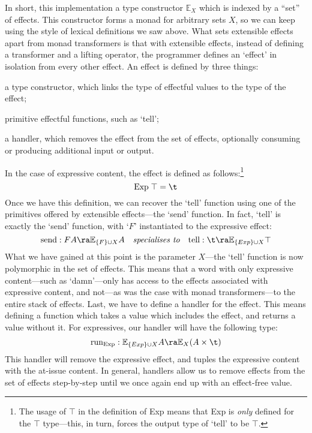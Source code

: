 In short, this implementation a type constructor $\mathbb{E}_X$ which
is indexed by a ``set'' of effects. This constructor forms a monad for
arbitrary sets $X$, so we can keep using the style of lexical
definitions we saw above.
What sets extensible effects apart from monad transformers is that
with extensible effects, instead of defining a transformer and a
lifting operator, the programmer defines an `effect' in isolation from
every other effect. An effect is defined by three things:
\begin{enumerate*}[label=\arabic*)]
\item a type constructor, which links the type of effectful values to
  the type of the effect;
\item primitive effectful functions, such as `tell';
\item a handler, which removes the effect from the set of effects,
  optionally consuming or producing additional input or output.
\end{enumerate*}
In the case of expressive content, the effect is
defined as follows:\footnote{%
  The usage of $\top$ in the definition of Exp means that Exp is
  \emph{only} defined for the $\top$ type---this, in turn, forces the
  output type of `tell' to be $\top$.
}
\[
  \text{Exp}\;\top=\t
\]
Once we have this definition, we can recover the `tell' function using
one of the primitives offered by extensible effects---the `send'
function. In fact, `tell' is exactly the `send' function, with `$F$'
instantiated to the expressive effect:
\[
  \text{send} : FA\ra\mathbb{E}_{\{F\}\cup X}A
  \quad
  \textit{specialises to}
  \quad
  \text{tell} : \t\ra\mathbb{E}_{\{Exp\}\cup X}\top
\]
What we have gained at this point is the parameter $X$---the `tell'
function is now polymorphic in the set of effects. This means that a
word with only expressive content---such as `damn'---only has access
to the effects associated with expressive content, and not---as was
the case with monad transformers---to the entire stack of effects.
Last, we have to define a handler for the effect. This means defining
a function which takes a value which includes the effect, and returns
a value without it. For expressives, our handler will have the
following type:
\[
  \text{run}_{\text{Exp}} : \mathbb{E}_{\{Exp\}\cup X}A\ra\mathbb{E}_{X}(A\times\t)
\]
This handler will remove the expressive effect, and tuples the
expressive content with the at-issue content. In general, handlers
allow us to remove effects from the set of effects step-by-step until
we once again end up with an effect-free value.


